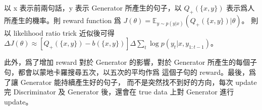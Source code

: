 \documentclass[12pt, a4paper]{article}
\theoremstyle{mystyle}	%
\begin{document}
\begin{enumerate}
\begin{enumerate}
    以 x 表示前兩句話，y 表示 Generator 所產生的句子，以
    $Q_+(\{x,y\})$ 表示爲人所產生的機率。則 reward function
    爲 $J(\theta) = \mathbb{E}_{y \sim p(y|x)}(Q_+(\{x, y\})|\theta) $。
    則以 likelihood ratio trick 近似後可得
    $\Delta J(\theta) \approx [Q_+(\{x,y\})-b(\{x,y\})] \Delta 
    \sum\limits_t \log p(y_t|x,y_{1:t-1})$。

    此外，爲了增加 reward 對於 Generator 的影響，對於 Generator
    所產生的每個子句，都會以蒙地卡羅搜尋五次，以五次的平均作爲
    這個子句的 reward。最後，爲了讓 Generator 能持續產生好的句子，
    而不是突然找不到好的方向，每次 update 完 Discriminator 及
    Generator 後，還會在 true data 上對 Generator 進行 update。
\end{enumerate}
\end{enumerate}
\end{document}
